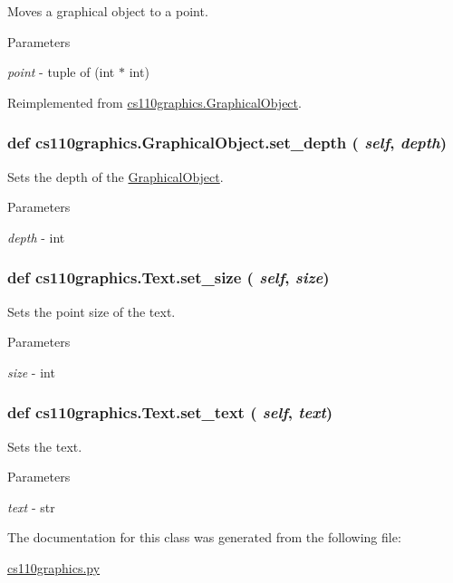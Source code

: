 Moves a graphical object to a point. 
\begin{DoxyParams}{Parameters}
\item[{\em point}]-\/ tuple of (int $\ast$ int) \end{DoxyParams}


Reimplemented from \hyperlink{classcs110graphics_1_1GraphicalObject_abe2d480265df7ac9447205c52c6946df}{cs110graphics.GraphicalObject}.\hypertarget{classcs110graphics_1_1GraphicalObject_a20d76d4ee4419c3065d61deb6cbc6700}{
\subsubsection[{set\_\-depth}]{\setlength{\rightskip}{0pt plus 5cm}def cs110graphics.GraphicalObject.set\_\-depth ( {\em self}, \/   {\em depth})}}
\label{classcs110graphics_1_1GraphicalObject_a20d76d4ee4419c3065d61deb6cbc6700}


Sets the depth of the \hyperlink{classcs110graphics_1_1GraphicalObject}{GraphicalObject}. 
\begin{DoxyParams}{Parameters}
\item[{\em depth}]-\/ int \end{DoxyParams}
\hypertarget{classcs110graphics_1_1Text_ad470aa26235fc2f5f1459c3750251207}{
\subsubsection[{set\_\-size}]{\setlength{\rightskip}{0pt plus 5cm}def cs110graphics.Text.set\_\-size ( {\em self}, \/   {\em size})}}
\label{classcs110graphics_1_1Text_ad470aa26235fc2f5f1459c3750251207}


Sets the point size of the text. 
\begin{DoxyParams}{Parameters}
\item[{\em size}]-\/ int \end{DoxyParams}
\hypertarget{classcs110graphics_1_1Text_ab12aa7478ca6a2b2015b7e8544674c73}{
\subsubsection[{set\_\-text}]{\setlength{\rightskip}{0pt plus 5cm}def cs110graphics.Text.set\_\-text ( {\em self}, \/   {\em text})}}
\label{classcs110graphics_1_1Text_ab12aa7478ca6a2b2015b7e8544674c73}


Sets the text. 
\begin{DoxyParams}{Parameters}
\item[{\em text}]-\/ str \end{DoxyParams}


The documentation for this class was generated from the following file:\begin{DoxyCompactItemize}
\item 
\hyperlink{cs110graphics_8py}{cs110graphics.py}\end{DoxyCompactItemize}
